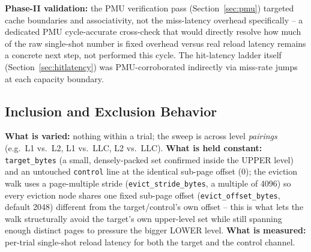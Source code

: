 \documentclass{article}
\begin{document}
\textbf{Phase-II validation:} the PMU verification pass (Section~\ref{sec:pmu}) targeted
cache boundaries and associativity, not the miss-latency overhead specifically -- a
dedicated PMU cycle-accurate cross-check that would directly resolve how much of the raw
single-shot number is fixed overhead versus real reload latency remains a concrete next
step, not performed this cycle. The hit-latency ladder itself (Section~\ref{sec:hitlatency})
was PMU-corroborated indirectly via miss-rate jumps at each capacity boundary.

\subsection{Inclusion and Exclusion Behavior}
\label{sec:inclusion}

\textbf{What is varied:} nothing within a trial; the sweep is across level \emph{pairings}
(e.g.\ L1 vs.\ L2, L1 vs.\ LLC, L2 vs.\ LLC). \textbf{What is held constant:}
\texttt{target\_bytes} (a small, densely-packed set confirmed inside the UPPER level) and
an untouched \texttt{control} line at the identical sub-page offset (0); the eviction walk
uses a page-multiple stride (\texttt{evict\_stride\_bytes}, a multiple of 4096) so every
eviction node shares one fixed sub-page offset (\texttt{evict\_offset\_bytes}, default
2048) different from the target/control's own offset -- this is what lets the walk
structurally avoid the target's own upper-level set while still spanning enough distinct
pages to pressure the bigger LOWER level. \textbf{What is measured:} per-trial single-shot
reload latency for both the target and the control channel.
\end{document}
